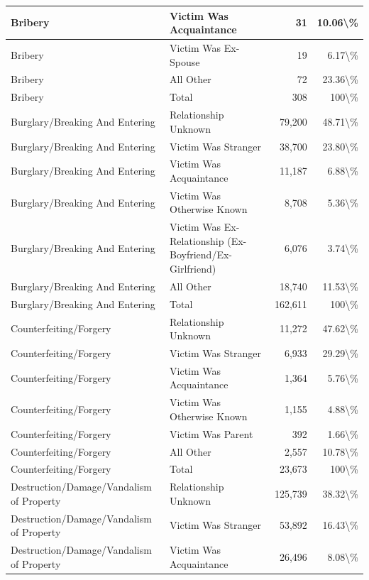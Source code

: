 \documentclass[
]{krantz}
\begin{document}
\begin{longtable}[t]{l|l|r|r}
\hline
Bribery & Victim Was Acquaintance & 31 & 10.06\textbackslash{}\%\\
\hline
Bribery & Victim Was Ex-Spouse & 19 & 6.17\textbackslash{}\%\\
\hline
Bribery & All Other & 72 & 23.36\textbackslash{}\%\\
\hline
Bribery & Total & 308 & 100\textbackslash{}\%\\
\hline
Burglary/Breaking And Entering & Relationship Unknown & 79,200 & 48.71\textbackslash{}\%\\
\hline
Burglary/Breaking And Entering & Victim Was Stranger & 38,700 & 23.80\textbackslash{}\%\\
\hline
Burglary/Breaking And Entering & Victim Was Acquaintance & 11,187 & 6.88\textbackslash{}\%\\
\hline
Burglary/Breaking And Entering & Victim Was Otherwise Known & 8,708 & 5.36\textbackslash{}\%\\
\hline
Burglary/Breaking And Entering & Victim Was Ex-Relationship (Ex-Boyfriend/Ex-Girlfriend) & 6,076 & 3.74\textbackslash{}\%\\
\hline
Burglary/Breaking And Entering & All Other & 18,740 & 11.53\textbackslash{}\%\\
\hline
Burglary/Breaking And Entering & Total & 162,611 & 100\textbackslash{}\%\\
\hline
Counterfeiting/Forgery & Relationship Unknown & 11,272 & 47.62\textbackslash{}\%\\
\hline
Counterfeiting/Forgery & Victim Was Stranger & 6,933 & 29.29\textbackslash{}\%\\
\hline
Counterfeiting/Forgery & Victim Was Acquaintance & 1,364 & 5.76\textbackslash{}\%\\
\hline
Counterfeiting/Forgery & Victim Was Otherwise Known & 1,155 & 4.88\textbackslash{}\%\\
\hline
Counterfeiting/Forgery & Victim Was Parent & 392 & 1.66\textbackslash{}\%\\
\hline
Counterfeiting/Forgery & All Other & 2,557 & 10.78\textbackslash{}\%\\
\hline
Counterfeiting/Forgery & Total & 23,673 & 100\textbackslash{}\%\\
\hline
Destruction/Damage/Vandalism of Property & Relationship Unknown & 125,739 & 38.32\textbackslash{}\%\\
\hline
Destruction/Damage/Vandalism of Property & Victim Was Stranger & 53,892 & 16.43\textbackslash{}\%\\
\hline
Destruction/Damage/Vandalism of Property & Victim Was Acquaintance & 26,496 & 8.08\textbackslash{}\%\\

\end{longtable}
\end{document}
